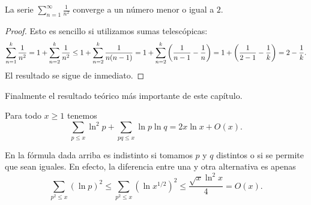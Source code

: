 \begin{lemma}
  \label{lem:sum-1-n2}
  La serie \(\displaystyle{\sum_{n = 1}^\infty \frac{1}{n ^ 2}}\)
  converge a un n\'umero menor o igual a \(2\).
\end{lemma}

\begin{proof}
  Esto es sencillo si utilizamos sumas telesc\'opicas: 
  \[
    \sum_{n = 1}^k \frac{1}{n^2}
    = 1 + \sum_{n = 2}^k \frac{1}{n^2} 
    \leq 1 + \sum_{n = 2}^k \frac{1}{n (n - 1)}
    = 1 + \sum_{n = 2}^k \left( \frac{1}{n - 1} - \frac{1}{n} \right)
    = 1 + \left( \frac{1}{2 - 1} - \frac{1}{k} \right)
    = 2 - \frac{1}{k}.
  \]
  El resultado se sigue de inmediato.
\end{proof}

Finalmente el resultado te\'orico m\'as importante de este cap\'itulo.

\begin{theorem}
  \label{thm:selberg}
  Para todo \(x \geq 1\) tenemos
  \[
    \sum_{p \leq x} \ln^2 p + \sum_{pq \leq x} \ln p \ln q = 2x\ln x + O(x).
  \]
\end{theorem}

\begin{note}
  En la f\'ormula dada arriba es indistinto si tomamos
  \(p\) y \(q\) distintos o si se permite que sean iguales.
  En efecto, la diferencia entre una y otra alternativa es apenas
  \[
    \sum_{p^2 \le x} (\ln p)^2
    \le \sum_{p^2 \le x} (\ln x^{1/2})^2
    \le \frac{\sqrt{x} \ln^2 x}{4}
    = O(x).
  \]
\end{note}

